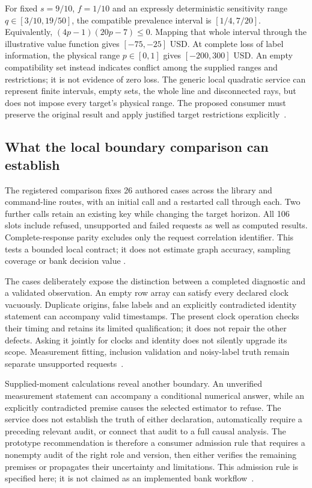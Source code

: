 For fixed $s=9/10$, $f=1/10$ and an expressly deterministic sensitivity
range $q\in[3/10,19/50]$, the compatible prevalence interval is
$[1/4,7/20]$. Equivalently,
$(4p-1)(20p-7)\leq0$. Mapping that whole interval through the illustrative
value function gives $[-75,-25]$ USD. At complete loss of label information,
the physical range $p\in[0,1]$ gives $[-200,300]$ USD. An empty compatibility
set instead indicates conflict among the supplied ranges and restrictions;
it is not evidence of zero loss. The generic local quadratic service can
represent finite intervals, empty sets, the whole line and disconnected
rays, but does not impose every target's physical range. The proposed
consumer must preserve the original result and apply justified target
restrictions explicitly~\citep{exec13_observation_exact,exec13_observation_primary}.

\subsection{What the local boundary comparison can establish}

The registered comparison fixes 26 authored cases across the library and
command-line routes, with an initial call and a restarted call through each.
Two further calls retain an existing key while changing the target horizon.
All 106 slots include refused, unsupported and failed requests as well as
computed results. Complete-response parity excludes only the request
correlation identifier. This tests a bounded local contract; it does not
estimate graph accuracy, sampling coverage or bank decision value
\citep{exec13_observation_design,exec13_observation_run}.

The cases deliberately expose the distinction between a completed diagnostic
and a validated observation. An empty row array can satisfy every declared
clock vacuously. Duplicate origins, false labels and an explicitly contradicted
identity statement can accompany valid timestamps. The present clock operation
checks their timing and retains its limited qualification; it does not repair
the other defects. Asking it jointly for clocks and identity does not silently
upgrade its scope. Measurement fitting, inclusion validation and noisy-label
truth remain separate unsupported requests~\citep{exec13_observation_primary,exec13_observation_run}.

Supplied-moment calculations reveal another boundary. An unverified measurement
statement can accompany a conditional numerical answer, while an explicitly
contradicted premise causes the selected estimator to refuse. The service
does not establish the truth of either declaration, automatically require
a preceding relevant audit, or connect that audit to a full causal analysis.
The prototype recommendation is therefore a consumer admission rule that
requires a nonempty audit of the right role and version, then either verifies
the remaining premises or propagates their uncertainty and limitations.
This admission rule is specified here; it is not claimed as an implemented
bank workflow~\citep{exec13_observation_design,exec13_observation_run}.



